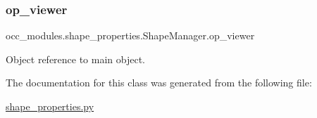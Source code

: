 \subsubsection{\texorpdfstring{op\+\_\+viewer}{op\_viewer}}
{\footnotesize\ttfamily occ\+\_\+modules.\+shape\+\_\+properties.\+Shape\+Manager.\+op\+\_\+viewer}



Object reference to main object. 



The documentation for this class was generated from the following file\+:\begin{DoxyCompactItemize}
\item 
\hyperlink{shape__properties_8py}{shape\+\_\+properties.\+py}\end{DoxyCompactItemize}
